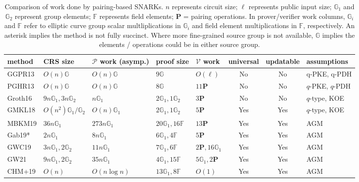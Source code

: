 \begin{table}[!t]
\caption{Comparison of work done by pairing-based SNARKs. 
$n$ represents circuit size; $\ell$ represents public input size; $\mathbb{G}_1$ and 
$\mathbb{G}_2$ represent group elements; $\mathbb{F}$ represents field elements; $\mathbf{P}$ = pairing operations. 
In prover/verifier work columns, $\mathbb{G}_i$ and $\mathbb{F}$ refer to elliptic curve group scalar multliplications in $\mathbb{G}_i$ 
and field element multiplications in $\mathbb{F}$, respectively. An asterisk implies the method is not fully succinct. Where more fine-grained 
source group is not available, $\mathbb{G}$ implies the elements / operations could be in either source group.}
\label{tbl:snark}
\begin{tabular}{|l|l|l|p{3.2cm}|l|c|c|l|}
\hline
\toprule
method & CRS size & $\mathcal{P}$ work (asymp.) & proof size & $\mathcal{V}$ work & universal & updatable & assumptions \\ \hline\toprule
\midrule
GGPR13 & $O(n) \mathbb{G}$ & $O(n) \mathbb{G}$ & $9 \mathbb{G}$ & $O(\ell)$ & No & No & q-PKE, q-PDH \\ \hline
PGHR13 & $O(n) \mathbb{G}$ & $O(n) \mathbb{G}$ & $8 \mathbb{G}$ & $11 \mathbf{P}$ & No & No & $q$-PKE, $q$-PDH \\ \hline
Groth16 & $9n \mathbb{G}_1, 3n \mathbb{G}_2$ & $n \mathbb{G}_1$ & $2 \mathbb{G}_1, 1 \mathbb{G}_2$ & $3 \mathbf{P}$ & No & No & $q$-type, KOE \\ \hline
GMKL18 & $O(n^2) \mathbb{G}_1 / \mathbb{G}_2$ & $O(n) \mathbb{G}_1$ & $2 \mathbb{G}_1, 1 \mathbb{G}_2$ & $5 \mathbf{P}$ & Yes & Yes & $q$-type, KOE \\ \hline
MBKM19 & $36n \mathbb{G}_1$ & $273n \mathbb{G}_1$ & $20 \mathbb{G}_1, 16 \mathbb{F}$ & $13 \mathbf{P}$ & Yes & Yes & AGM \\ \hline
Gab19* & $2n \mathbb{G}_1$ & $8n \mathbb{G}_1$ & $6 \mathbb{G}_1, 4 \mathbb{F}$ & $5 \mathbf{P}$ & Yes & Yes & AGM \\ \hline
GWC19 & $3n \mathbb{G}_1, 2 \mathbb{G}_2$ & $11n \mathbb{G}_1$ & $7 \mathbb{G}_1, 6 \mathbb{F}$ & $2 \mathbf{P}, 16 \mathbb{G}_1$ & Yes & Yes & AGM \\ \hline
GW21 & $9n \mathbb{G}_1, 2 \mathbb{G}_2$ & $35n \mathbb{G}_1$ & $4 \mathbb{G}_1, 15 \mathbb{F}$ & $5 \mathbb{G}_1, 2 \mathbf{P}$ & Yes & Yes & AGM \\ \hline
CHM+19 & $O(n)$ & $O(n \log n)$ & $13 \mathbb{G}_1, 8 \mathbb{F}$ & $O(1)$ & Yes & Yes & AGM \\ \hline\bottomrule
\bottomrule
\bottomrule
\end{tabular}
\end{table}
